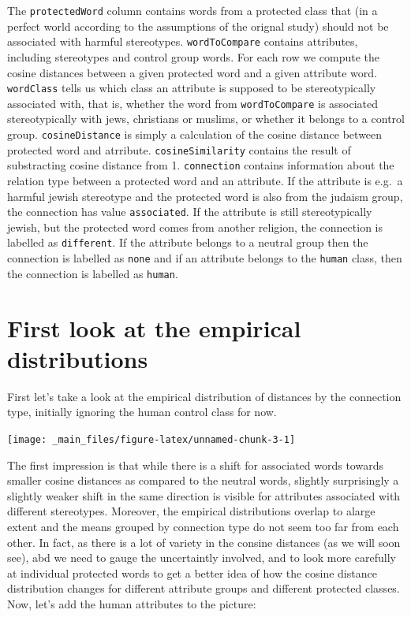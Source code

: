 \documentclass[12pt,]{book}
\begin{document}
\normalsize

The \texttt{protectedWord} column contains words from a protected class
that (in a perfect world according to the assumptions of the orignal
study) should not be associated with harmful stereotypes.
\texttt{wordToCompare} contains attributes, including stereotypes and
control group words. For each row we compute the cosine distances
between a given protected word and a given attribute word.
\texttt{wordClass} tells us which class an attribute is supposed to be
stereotypically associated with, that is, whether the word from
\texttt{wordToCompare} is associated stereotypically with jews,
christians or muslims, or whether it belongs to a control group.
\texttt{cosineDistance} is simply a calculation of the cosine distance
between protected word and atrribute. \texttt{cosineSimilarity} contains
the result of substracting cosine distance from 1. \texttt{connection}
contains information about the relation type between a protected word
and an attribute. If the attribute is e.g.~a harmful jewish stereotype
and the protected word is also from the judaism group, the connection
has value \texttt{associated}. If the attribute is still stereotypically
jewish, but the protected word comes from another religion, the
connection is labelled as \texttt{different}. If the attribute belongs
to a neutral group then the connection is labelled as \texttt{none} and
if an attribute belongs to the \texttt{human} class, then the connection
is labelled as \texttt{human}.

\section{First look at the empirical
distributions}\label{first-look-at-the-empirical-distributions}

First let's take a look at the empirical distribution of distances by
the connection type, initially ignoring the human control class for now.

\vspace{1mm} \footnotesize

\begin{center}\texttt{[image: \_main\_files/figure-latex/unnamed-chunk-3-1]} \end{center}

\normalsize

The first impression is that while there is a shift for associated words
towards smaller cosine distances as compared to the neutral words,
slightly surprisingly a slightly weaker shift in the same direction is
visible for attributes associated with different stereotypes. Moreover,
the empirical distributions overlap to alarge extent and the means
grouped by connection type do not seem too far from each other. In fact,
as there is a lot of variety in the consine distances (as we will soon
see), abd we need to gauge the uncertaintly involved, and to look more
carefully at individual protected words to get a better idea of how the
cosine distance distribution changes for different attribute groups and
different protected classes. Now, let's add the human attributes to the
picture:
\end{document}
